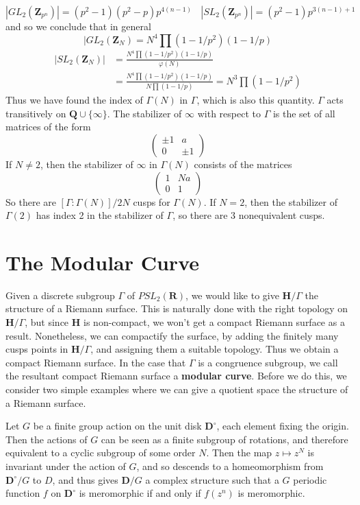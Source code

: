 \begin{example}
%
\[ |GL_2(\mathbf{Z}_{p^n})| = (p^2 - 1)(p^2 - p) p^{4(n-1)}\ \ \ \ |SL_2(\mathbf{Z}_{p^n})| = (p^2 - 1)p^{3(n-1) + 1} \]
%
and so we conclude that in general
%
\[ |GL_2(\mathbf{Z}_N) = N^4 \prod (1 - 1/p^2)(1 - 1/p) \]
%
\begin{align*}
    |SL_2(\mathbf{Z}_N)| &= \frac{N^4 \prod (1 - 1/p^2)(1 - 1/p)}{\varphi(N)}\\
    &= \frac{N^4 \prod (1 - 1/p^2)(1 - 1/p)}{N \prod (1 - 1/p)} = N^3 \prod (1 - 1/p^2)
\end{align*}
%
Thus we have found the index of $\Gamma(N)$ in $\Gamma$, which is also this quantity. $\Gamma$ acts transitively on $\mathbf{Q} \cup \{ \infty \}$. The stabilizer of $\infty$ with respect to $\Gamma$ is the set of all matrices of the form
%
\[ \begin{pmatrix} \pm 1 & a \\ 0 & \pm 1 \end{pmatrix} \]
%
If $N \neq 2$, then the stabilizer of $\infty$ in $\Gamma(N)$ consists of the matrices
%
\[ \begin{pmatrix} 1 & Na \\ 0 & 1 \end{pmatrix} \]
%
So there are $[\Gamma:\Gamma(N)]/2N$ cusps for $\Gamma(N)$. If $N = 2$, then the stabilizer of $\Gamma(2)$ has index 2 in the stabilizer of $\Gamma$, so there are $3$ nonequivalent cusps.
\end{example}

\section{The Modular Curve}

Given a discrete subgroup $\Gamma$ of $PSL_2(\mathbf{R})$, we would like to give $\mathbf{H}/\Gamma$ the structure of a Riemann surface. This is naturally done with the right topology on $\mathbf{H}/\Gamma$, but since $\mathbf{H}$ is non-compact, we won't get a compact Riemann surface as a result. Nonetheless, we can compactify the surface, by adding the finitely many cusps points in $\mathbf{H}/\Gamma$, and assigning them a suitable topology. Thus we obtain a compact Riemann surface. In the case that $\Gamma$ is a congruence subgroup, we call the resultant compact Riemann surface a {\bf modular curve}. Before we do this, we consider two simple examples where we can give a quotient space the structure of a Riemann surface.

\begin{example}
    Let $G$ be a finite group action on the unit disk $\mathbf{D}^\circ$, each element fixing the origin. Then the actions of $G$ can be seen as a finite subgroup of rotations, and therefore equivalent to a cyclic subgroup of some order $N$. Then the map $z \mapsto z^N$ is invariant under the action of $G$, and so descends to a homeomorphism from $\mathbf{D}^\circ/G$ to $D$, and thus gives $\mathbf{D}/G$ a complex structure such that a $G$ periodic function $f$ on $\mathbf{D}^\circ$ is meromorphic if and only if $f(z^n)$ is meromorphic.
\end{example}

